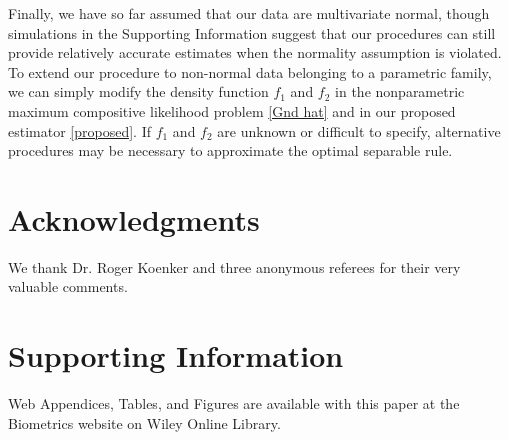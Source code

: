 \documentclass[useAMS,referee,usenatbib]{biom}
\begin{document}
Finally, we have so far assumed that our data are multivariate normal, though simulations in the Supporting Information suggest that our procedures can still provide relatively accurate estimates when the normality assumption is violated. To extend our procedure to non-normal data belonging to a parametric family, we can simply modify the density function $f_1$ and $f_2$ in the nonparametric maximum compositive likelihood problem \eqref{Gnd hat} and in our proposed estimator \eqref{proposed}. If $f_1$ and $f_2$ are unknown or difficult to specify, alternative procedures may be necessary to approximate the optimal separable rule.

\backmatter

\section*{Acknowledgments}
We thank Dr. Roger Koenker and three anonymous referees for their very valuable comments.\vspace*{-8pt}


 


\section*{Supporting Information}
Web Appendices, Tables, and Figures are available with this paper at the Biometrics website on Wiley Online Library.

\appendix
\section{}
\end{document}
